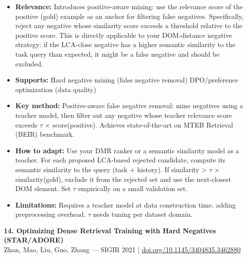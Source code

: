 \documentclass[pdflatex,sn-mathphys-num]{sn-jnl}
\theoremstyle{thmstyleone}
\theoremstyle{thmstyletwo}
\theoremstyle{thmstylethree}
\begin{document}
\begin{itemize}
    \item \textbf{Relevance:} Introduces positive-aware mining: use the relevance score of the positive (gold) example as an anchor for filtering false negatives. Specifically, reject any negative whose similarity score exceeds a threshold relative to the positive score. This is directly applicable to your DOM-distance negative strategy: if the LCA-close negative has a higher semantic similarity to the task query than expected, it might be a false negative and should be excluded.
    \item \textbf{Supports:} \checkmark Hard negative mining (false negative removal) \checkmark DPO/preference optimization (data quality)
    \item \textbf{Key method:} Positive-aware false negative removal: mine negatives using a teacher model, then filter out any negative whose teacher relevance score exceeds $\tau$ $\times$ score(positive). Achieves state-of-the-art on MTEB Retrieval (BEIR) benchmark.
    \item \textbf{How to adapt:} Use your DMR ranker or a semantic similarity model as a teacher. For each proposed LCA-based rejected candidate, compute its semantic similarity to the query (task + history). If similarity > $\tau$ $\times$ similarity(gold), exclude it from the rejected set and use the next-closest DOM element. Set $\tau$ empirically on a small validation set.
    \item \textbf{Limitations:} Requires a teacher model at data construction time, adding preprocessing overhead. $\tau$ needs tuning per dataset domain.
\end{itemize}

\textbf{14. Optimizing Dense Retrieval Training with Hard Negatives (STAR/ADORE)} \\
Zhan, Mao, Liu, Guo, Zhang --- SIGIR 2021 | \href{https://dl.acm.org/doi/10.1145/3404835.3462880}{doi.org/10.1145/3404835.3462880}
\end{document}
